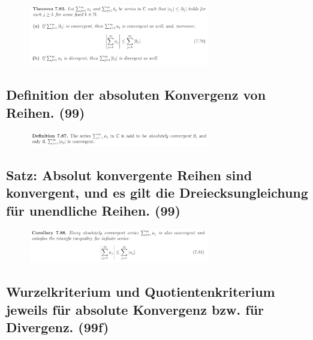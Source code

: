 \begin{figure}[H] \centering
\includegraphics[width=0.7\textwidth]{media/8-7.png}
\end{figure}

\subsection{Definition der absoluten Konvergenz von Reihen. (99)}

\begin{figure}[H] \centering
\includegraphics[width=0.7\textwidth]{media/8-8.png}
\end{figure}

\subsection{Satz: Absolut konvergente Reihen sind konvergent, und es gilt die Dreiecksungleichung für unendliche Reihen. (99)}

\begin{figure}[H] \centering
\includegraphics[width=0.7\textwidth]{media/8-9.png}
\end{figure}

\subsection{Wurzelkriterium und Quotientenkriterium jeweils für absolute Konvergenz bzw. für Divergenz. (99f)}

